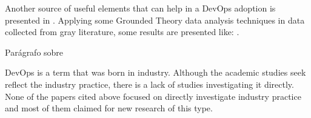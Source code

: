 Another source of useful elements that can help in a DevOps adoption is
presented in \cite{characterizing_devops_sbes_2016}. Applying some Grounded
Theory data analysis techniques in data collected from gray literature, some
results are presented like: .

Parágrafo sobre \cite{a_qualitative_study_journal_sw_17}

DevOps is a term that was born in industry. Although the academic studies seek
reflect the industry practice, there is a lack of studies investigating it
directly. None of the papers cited above focused on directly investigate
industry practice and most of them claimed for new research of this type.
